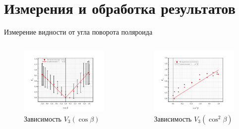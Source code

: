 \documentclass[11pt]{beamer} %
\begin{document}
    \section{Измерения и обработка результатов} 
    
    \begin{frame}{Измерение видности от угла поворота поляроида}
        \begin{columns}
            \begin{figure}[H]
            \centering
                \includegraphics[width = \textwidth]{images/v3_cos.png}
                \caption{Зависимость $V_3 (\cos \beta )$}
            \end{figure}

            \begin{figure}[H]
            \centering
                \includegraphics[width = 1.1\textwidth]{images/v3_coscos.png}
                \caption{Зависимость $V_3 (\cos^2 \beta )$}
            \end{figure}
        \end{columns}
    \end{frame}
\end{document}
